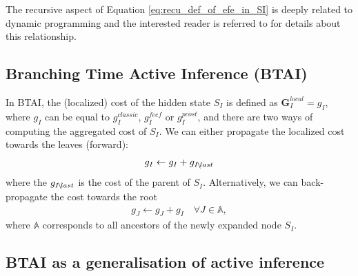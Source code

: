 \documentclass[twoside,11pt]{article}
\newcommand*\IdMLast[1]{{\normalfont #1\hspace{-0.04cm}\setminus\hspace{-0.04cm} last}}
\begin{document}
\begin{remark}
The recursive aspect of Equation \ref{eq:recu_def_of_efe_in_SI} is deeply related to dynamic programming and the interested reader is referred to \citet{dacosta2020relationship} for details about this relationship.
\end{remark}

\subsection{Branching Time Active Inference (BTAI)}

In BTAI, the (localized) cost of the hidden state $S_I$ is defined as $\bm{G}^{local}_I = g_I$, where $g_I$ can be equal to $g^{classic}_I$, $g^{feef}_I$ or $g^{pcost}_I$, and there are two ways of computing the aggregated cost of $S_I$. We can either propagate the localized cost towards the leaves (forward):
\begin{align}
g_I \leftarrow g_I + g_\IdMLast{I}
\end{align}
where the $g_\IdMLast{I}$ is the cost of the parent of $S_I$. Alternatively, we can back-propagate the cost towards the root
\begin{align}
g_J \leftarrow g_J + g_I \quad \forall J \in \mathbb{A},
\end{align}
where $\mathbb{A}$ corresponds to all ancestors of the newly expanded node $S_I$. 

\subsection{BTAI as a generalisation of active inference}\label{ssec:BTAI_generalize_AI}
\end{document}
